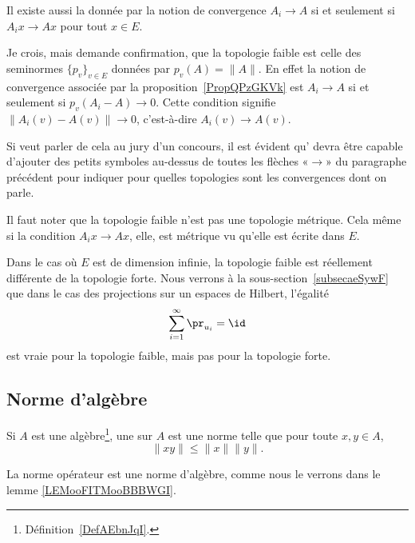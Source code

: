 Il existe aussi la  donnée par la notion de convergence \( A_i\to A\) si et seulement si \( A_ix\to Ax\) pour tout \( x\in E\).

\begin{probleme}
	Je crois, mais demande confirmation, que la topologie faible est celle des seminormes \( \{ p_v \}_{v\in E}\) données par \( p_v(A)=\| A \|\). En effet la notion de convergence associée par la proposition~\ref{PropQPzGKVk} est \( A_i\to A\) si et seulement si \( p_v(A_i-A)\to 0\). Cette condition signifie \( \| A_i(v)-A(v) \|\to 0\), c'est-à-dire \( A_i(v)\to A(v)\).

	Si  veut parler de cela au jury d'un concours, il est évident qu' devra être capable d'ajouter des petits symboles au-dessus de toutes les flèches «\( \to\)» du paragraphe précédent pour indiquer pour quelles topologies sont les convergences dont on parle.
\end{probleme}

\begin{remark}
	Il faut noter que la topologie faible n'est pas une topologie métrique. Cela même si la condition \( A_ix\to Ax\), elle, est métrique vu qu'elle est écrite dans \( E\).

	Dans le cas où \( E\) est de dimension infinie, la topologie faible est réellement différente de la topologie forte. Nous verrons à la sous-section~\ref{subsecaeSywF} que dans le cas des projections sur un espaces de Hilbert, l'égalité
	\begin{equation}
		\sum_{i=1}^{\infty}\pr_{u_i}=\id
	\end{equation}
	est vraie pour la topologie faible, mais pas pour la topologie forte.
\end{remark}

\subsection{Norme d'algèbre}

\begin{definition}  \label{DefJWRWQue}
	Si \( A\) est une algèbre\footnote{Définition~\ref{DefAEbnJqI}.}, une  sur \( A\) est une norme telle que pour toute \( x,y\in A\),
	\begin{equation}
		\| xy \|\leq \| x \|\| y \|.
	\end{equation}
\end{definition}
La norme opérateur est une norme d'algèbre, comme nous le verrons dans le lemme \ref{LEMooFITMooBBBWGI}.

